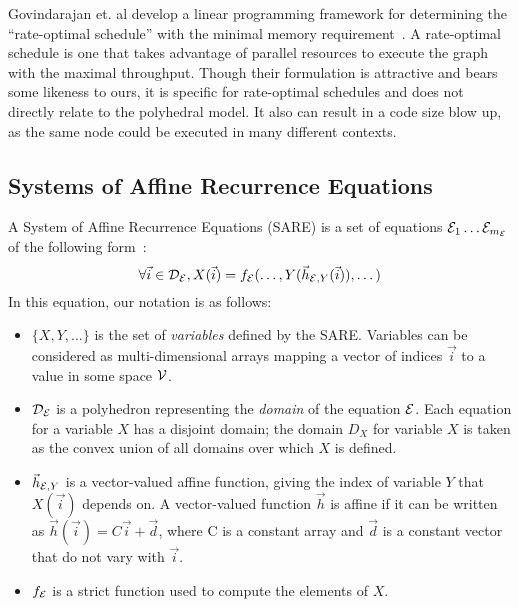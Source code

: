 Govindarajan et. al develop a linear programming framework for
determining the ``rate-optimal schedule'' with the minimal memory
requirement~\cite{GGD94}.  A rate-optimal schedule is one that takes
advantage of parallel resources to execute the graph with the maximal
throughput.  Though their formulation is attractive and bears some
likeness to ours, it is specific for rate-optimal schedules and does
not directly relate to the polyhedral model.  It also can result in a
code size blow up, as the same node could be executed in many
different contexts.

\subsection{Systems of Affine Recurrence Equations}

A System of Affine Recurrence Equations (SARE) is a set of equations
${\cal E}_1 \dots {\cal E}_{m_{\cal E}}$ of the following form~\cite{DRV00,Feautrier92i}:
\begin{equation}
\forall {\vec i} \in {\cal D_{\cal E}}, X({\vec i}) = f_{\cal E}(\dots, Y({\vec h}_{{\cal
E}, Y}({\vec i})), \dots)
\label{eq:sare}
\end{equation}
In this equation, our notation is as follows:
\begin{itemize}

\item $\{X, Y, \dots\}$ is the set of {\it variables} defined by the
SARE.  Variables can be considered as multi-dimensional arrays mapping
a vector of indices ${\vec i}$ to a value in some space ${\cal V}$.

\item ${\cal D_{\cal E}}$ is a polyhedron representing the {\it
domain} of the equation ${\cal E}$.  Each equation for a variable $X$
has a disjoint domain; the domain $D_X$ for variable $X$ is taken as
the convex union of all domains over which $X$ is defined.

\item ${\vec h}_{{\cal E}, Y}$ is a vector-valued affine function,
giving the index of variable $Y$ that $X({\vec i})$ depends on.  A
vector-valued function ${\vec h}$ is affine if it can be written as
${\vec h}({\vec i}) = C{\vec i} + {\vec d}$, where C is a constant
array and ${\vec d}$ is a constant vector that do not vary with ${\vec
i}$.

\item $f_{\cal E}$ is a strict function used to compute the elements
of $X$.

\end{itemize}

